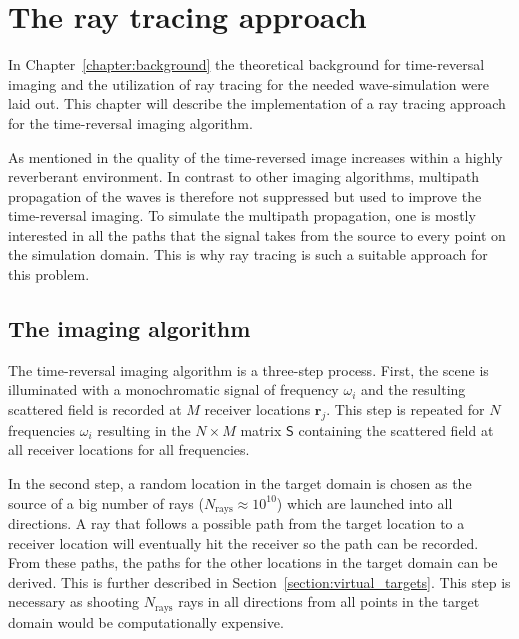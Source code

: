 
\chapter{The ray tracing approach}\label{chapter:the_raytracing_approach}
In Chapter~\ref{chapter:background} the theoretical background for time-reversal imaging and the utilization of ray tracing for the needed wave-simulation were laid out.
This chapter will describe the implementation of a ray tracing approach for the time-reversal imaging algorithm.

As mentioned in \parencite{dyab_critical_2013} the quality of the time-reversed image increases within a highly reverberant environment.
In contrast to other imaging algorithms, multipath propagation of the waves is therefore not suppressed but used to improve the time-reversal imaging.
To simulate the multipath propagation, one is mostly interested in all the paths that the signal takes from the source to every point on the simulation domain.
This is why ray tracing is such a suitable approach for this problem.

\section{The imaging algorithm}
The time-reversal imaging algorithm is a three-step process.
First, the scene is illuminated with a monochromatic signal of frequency \(\omega_i\) and the resulting scattered field is recorded at \(M\) receiver locations \(\mathbf{r}_j\). 
This step is repeated for \(N\) frequencies \(\omega_i\) resulting in the \(N \times M\) matrix \(\mathsf{S} \) containing the scattered field at all receiver locations for all frequencies.

In the second step, a random location in the target domain is chosen as the source of a big number of rays (\(N_{\text{rays}}\approx 10^{10}\)) which are launched into all directions.
A ray that follows a possible path from the target location to a receiver location will eventually hit the receiver so the path can be recorded.
From these paths, the paths for the other locations in the target domain can be derived.
This is further described in Section~\ref{section:virtual_targets}.
This step is necessary as shooting \(N_{\text{rays}}\) rays in all directions from all points in the target domain would be computationally expensive.

